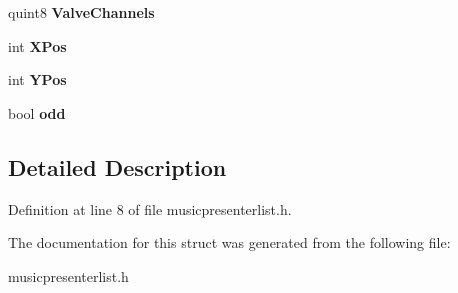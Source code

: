 \begin{DoxyCompactItemize}
quint8 {\bfseries Valve\+Channels}
\item 
\mbox{\label{struct_music_presenter_item_a1893b820d7e1c328e2aa1b00cad375ea}} 
int {\bfseries X\+Pos}
\item 
\mbox{\label{struct_music_presenter_item_abc1d1f25518a37bafa47998de66f5687}} 
int {\bfseries Y\+Pos}
\item 
\mbox{\label{struct_music_presenter_item_ad7c0917dbf73ba77551ed0c2f1d5fc1a}} 
bool {\bfseries odd}
\end{DoxyCompactItemize}


\subsection{Detailed Description}


Definition at line 8 of file musicpresenterlist.\+h.



The documentation for this struct was generated from the following file\+:\begin{DoxyCompactItemize}
\item 
musicpresenterlist.\+h\end{DoxyCompactItemize}
